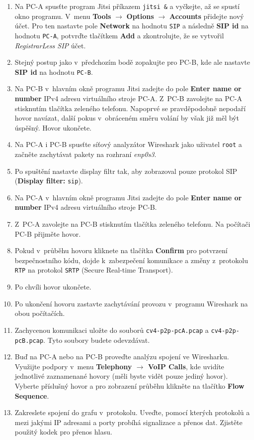 \begin{enumerate}
    \item Na PC-A spusťte program Jitsi příkazem \texttt{jitsi \&} a vyčkejte, až se spustí okno programu.
	V~menu {\bf Tools} $\rightarrow$ {\bf Options} $\rightarrow$ {\bf Accounts} přidejte nový účet. Pro ten nastavte pole {\bf Network} na hodnotu {\tt SIP} a následně {\bf SIP id} na hodnotu {\tt PC-A}, potvrďte tlačítkem \textbf{Add} a zkontrolujte, že se vytvořil \emph{RegistrarLess SIP} účet.
    \item Stejný postup jako v~předchozím bodě zopakujte pro PC-B, kde ale nastavte {\bf SIP id} na hodnotu {\tt PC-B}.
	\item Na PC-B v hlavním okně programu Jitsi zadejte do pole {\bf Enter name or number} IPv4 adresu virtuálního stroje PC-A.
	Z~PC-B zavolejte na PC-A stisknutím tlačítka zeleného telefonu. Napoprvé se pravděpodobně nepodaří hovor navázat, další pokus v~obráceném směru volání by však již měl být úspěšný.
	Hovor ukončete.
	\item Na PC-A i PC-B spusťte síťový analyzátor Wireshark jako uživatel \texttt{root} a začněte zachytávat pakety na rozhraní \emph{enp0s3}.
    \item Po spuštění nastavte display filtr tak, aby zobrazoval pouze protokol SIP (\textbf{Display filter:} \texttt{sip}).
    \item Na PC-A v hlavním okně programu Jitsi zadejte do pole {\bf Enter name or number} IPv4 adresu virtuálního stroje PC-B.
    \item Z~PC-A zavolejte na PC-B stisknutím tlačítka zeleného telefonu. Na počítači PC-B přijměte hovor.
	\item Pokud v~průběhu hovoru kliknete na tlačítka \textbf{Confirm} pro potvrzení bezpečnostního kódu, dojde k~zabezpečení komunikace a změny z~protokolu \texttt{RTP} na protokol \texttt{SRTP} (Secure Real-time Transport).
	\item Po chvíli hovor ukončete.
	\item Po ukončení hovoru zastavte zachytávání provozu v~programu Wireshark na obou počítačích.
	\item Zachycenou komunikaci uložte do souborů \texttt{cv4-p2p-pcA.pcap} a \texttt{cv4-p2p-pcB.pcap}. Tyto soubory budete odevzdávat.
    \item Buď na PC-A nebo na PC-B proveďte analýzu spojení ve Wiresharku. Využijte podpory v~menu {\bf Telephony $\rightarrow$ VoIP Calls}, kde uvidíte jednotlivé zaznamenané hovory (měli byste vidět pouze jediný hovor). Vyberte příslušný hovor a pro zobrazení průběhu klikněte na tlačítko {\bf Flow Sequence}.
    \item Zakreslete spojení do grafu v~protokolu. Uveďte, pomocí kterých protokolů a mezi jakými IP adresami a porty probíhá signalizace a přenos dat. Zjistěte použitý kodek pro přenos hlasu.\\


\end{enumerate}
